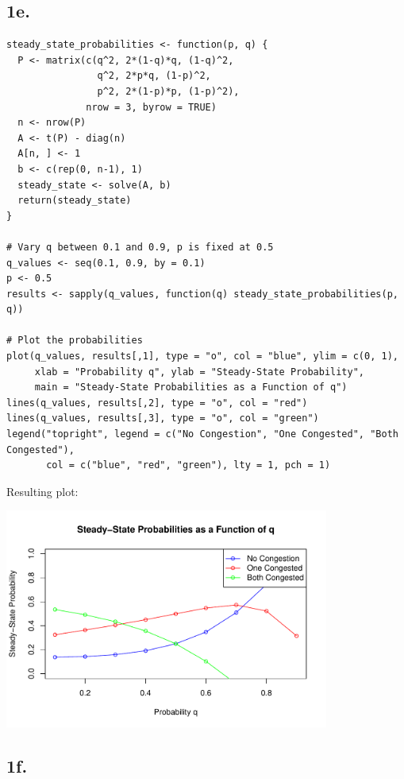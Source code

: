\documentclass[12pt]{article}
\begin{document}
\subsection*{1e.}

\begin{verbatim}
steady_state_probabilities <- function(p, q) {
  P <- matrix(c(q^2, 2*(1-q)*q, (1-q)^2,
                q^2, 2*p*q, (1-p)^2,
                p^2, 2*(1-p)*p, (1-p)^2),
              nrow = 3, byrow = TRUE)
  n <- nrow(P)
  A <- t(P) - diag(n)  
  A[n, ] <- 1          
  b <- c(rep(0, n-1), 1)  
  steady_state <- solve(A, b)
  return(steady_state)
}

# Vary q between 0.1 and 0.9, p is fixed at 0.5
q_values <- seq(0.1, 0.9, by = 0.1)
p <- 0.5
results <- sapply(q_values, function(q) steady_state_probabilities(p, q))

# Plot the probabilities
plot(q_values, results[,1], type = "o", col = "blue", ylim = c(0, 1),
     xlab = "Probability q", ylab = "Steady-State Probability",
     main = "Steady-State Probabilities as a Function of q")
lines(q_values, results[,2], type = "o", col = "red")
lines(q_values, results[,3], type = "o", col = "green")
legend("topright", legend = c("No Congestion", "One Congested", "Both Congested"),
       col = c("blue", "red", "green"), lty = 1, pch = 1)
\end{verbatim}

Resulting plot:

\begin{center}
    \includegraphics[width=0.8\textwidth]{project2_1e.pdf} %
\end{center}

\subsection*{1f.}
\end{document}
